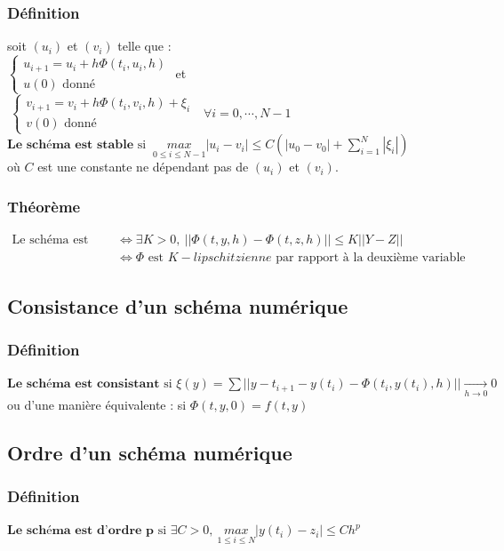 \documentclass[a4paper,10pt]{report}
\begin{document}
\subsubsection{Définition}
soit $(u_i)$ et $(v_i)$ telle que :\\
$\left\lbrace
\begin{array}{l}
u_{i+1}=u_i+h\Phi (t_i,u_i,h) \\
u(0) \text{ donné}
\end{array}\right.$
et  
$\ \left\lbrace
\begin{array}{l}
v_{i+1}=v_i+h\Phi (t_i,v_i,h) + \xi _i \\
v(0) \text{ donné}
\end{array}\right.
\ \ \ \forall i=0,\cdots , N-1$ \\
$\textbf{Le schéma est stable} \text{ si } \ \underset{0\leq i \leq N-1}{max} |u_i-v_i|\leq C \left( |u_0-v_0|+\sum \limits_{i=1}^N |\xi _i| \right)$\\
où $C$ est une constante ne dépendant pas de $(u_i)$ et $(v_i)$.

\subsubsection{Théorème}
\abovedisplayskip=0mm
\begin{align*}
   \text{Le schéma est stable} & \Leftrightarrow \exists K>0, \ ||\Phi(t,y,h)-\Phi(t,z,h)||\leq K||Y-Z|| \\
							   & \Leftrightarrow \Phi \text{ est } K-lipschitzienne \text{ par rapport à la deuxième variable}
\end{align*} 

\subsection{Consistance d'un schéma numérique}
\subsubsection{Définition}
$\textbf{Le schéma est consistant} \text{ si } \xi(y)=\sum ||y-t_{i+1}-y(t_i)-\Phi(t_i,y(t_i),h)|| \underset{h\rightarrow 0}{\longrightarrow} 0$\\
ou d'une manière équivalente : si $\Phi(t,y,0)=f(t,y)$

\subsection{Ordre d'un schéma numérique}
\subsubsection{Définition}
$\textbf{Le schéma est d'ordre p} \text{ si } \exists C > 0, \ \underset{1\leq i \leq N}{max} |y(t_i)-z_i| \leq Ch^p $
\end{document}
